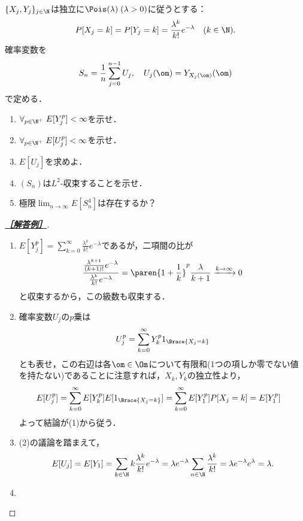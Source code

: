 \documentclass[uplatex,dvipdfmx]{jsarticle}
\begin{document}
\begin{tcolorbox}[colframe=ForestGreen, colback=ForestGreen!10!white,breakable,colbacktitle=ForestGreen!40!white,coltitle=black,fonttitle=\bfseries\sffamily,
    title=B 第14問（確率論）]
    $\{X_j,Y_j\}_{j\in\N}$は独立に$\Pois(\lambda)\;(\lambda>0)$に従うとする：
    \[P[X_j=k]=P[Y_j=k]=\frac{\lambda^k}{k!}e^{-\lambda}\quad(k\in\N).\]
    確率変数を
    \[S_n=\frac{1}{n}\sum_{j=0}^{n-1}U_j,\quad U_j(\om)=Y_{X_j(\om)}(\om)\]
    で定める．
    \begin{enumerate}
        \item $\forall_{p\in\N^+}\;E[Y_j^p]<\infty$を示せ．
        \item $\forall_{p\in\N^+}\;E[U_j^p]<\infty$を示せ．
        \item $E[U_j]$を求めよ．
        \item $(S_n)$は$L^2$-収束することを示せ．
        \item 極限$\lim_{n\to\infty}E[S_n^4]$は存在するか？
    \end{enumerate}
\end{tcolorbox}
\begin{proof}[\textbf{\underline{［解答例］}}]\mbox{}
    \begin{enumerate}
        \item $E[Y^p_j]=\sum_{k=0}^\infty\frac{\lambda^k}{k!}e^{-\lambda}$であるが，二項間の比が
        \[\frac{\frac{\lambda^{k+1}}{(k+1)!}e^{-\lambda}}{\frac{\lambda^k}{k!}e^{-\lambda}}=\paren{1+\frac{1}{k}}^p\frac{\lambda}{k+1}\xrightarrow{k\to\infty}0\]
        と収束するから，この級数も収束する．
        \item 確率変数$U_j$の$p$乗は
        \[U_j^p=\sum_{k=0}^\infty Y^p_k1_{\Brace{X_j=k}}\]
        とも表せ，この右辺は各$\om\in\Om$について有限和(1つの項しか零でない値を持たない)であることに注意すれば，$X_k,Y_k$の独立性より，
        \begin{align*}
            E[U_j^p]&=\sum_{k=0}^\infty E[Y_k^p]E[1_{\Brace{X_j=k}}]=\sum_{k=0}^\infty E[Y_1^p]P[X_j=k]=E[Y_1^p]
        \end{align*}
        よって結論が(1)から従う．
        \item (2)の議論を踏まえて，
        \[E[U_j]=E[Y_1]=\sum_{k\in\N}k\frac{\lambda^k}{k!}e^{-\lambda}=\lambda e^{-\lambda}\sum_{n\in\N}\frac{\lambda^k}{k!}=\lambda e^{-\lambda}e^\lambda=\lambda.\]
        \item 
    \end{enumerate}
\end{proof}
\end{document}
